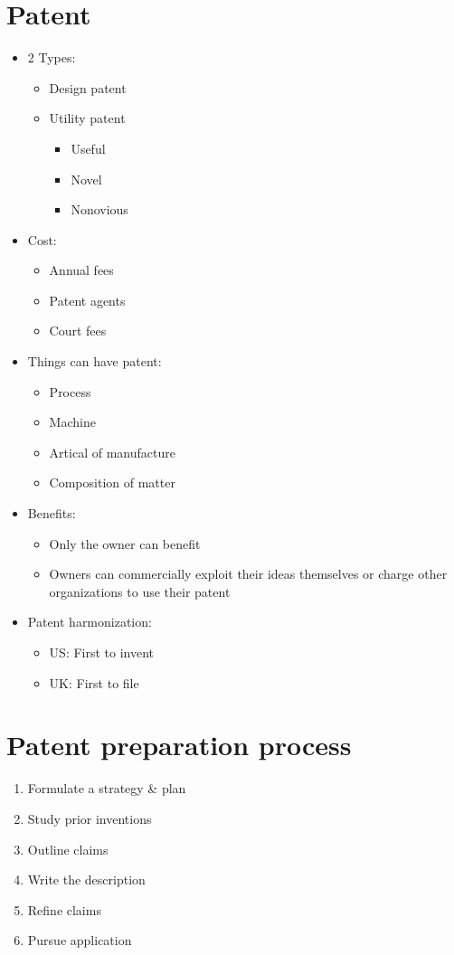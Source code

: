 \documentclass[openany,12pt,a4paper]{book}
\begin{document}
\section{Patent}
\begin{itemize}
    \item 2 Types:
    \begin{itemize}
        \item Design patent
        \item Utility patent
        \begin{itemize}
            \item Useful
            \item Novel
            \item Nonovious
        \end{itemize}
    \end{itemize}
    \item Cost:
    \begin{itemize}
        \item Annual fees
        \item Patent agents
        \item Court fees
    \end{itemize}
    \item Things can have patent:
    \begin{itemize}
        \item Process
        \item Machine
        \item Artical of manufacture
        \item Composition of matter
    \end{itemize}
    \item Benefits:
    \begin{itemize}
        \item Only the owner can benefit
        \item Owners can commercially exploit their ideas themselves or charge other organizations to use their patent
    \end{itemize}
    \item Patent harmonization:
    \begin{itemize}
        \item US: First to invent
        \item UK: First to file
    \end{itemize}
\end{itemize}
\section{Patent preparation process}
\begin{enumerate}
    \item Formulate a strategy \& plan
    \item Study prior inventions
    \item Outline claims
    \item Write the description
    \item Refine claims
    \item Pursue application
\end{enumerate}
\end{document}
